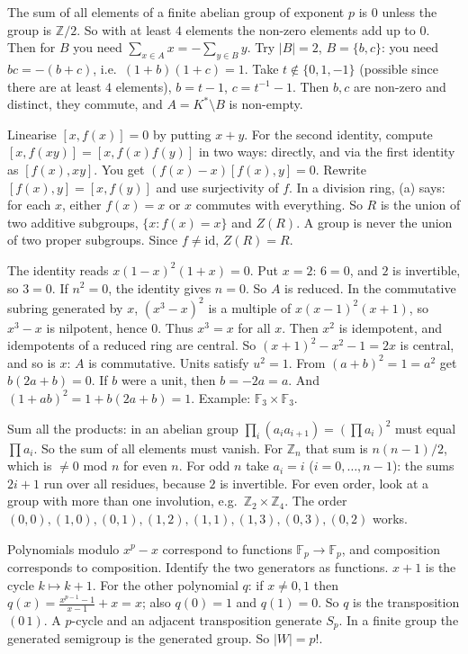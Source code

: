 \documentclass[11pt,a4paper]{article}
\begin{document}
 The sum of all elements of a finite abelian group of exponent $p$ is $0$ unless the group is $\mathbb Z/2$. So with at least $4$ elements the non-zero elements add up to $0$. Then for $B$ you need $\sum_{x\in A}x=-\sum_{y\in B}y$.
 Try $|B|=2$, $B=\{b,c\}$: you need $bc=-(b+c)$, i.e.\ $(1+b)(1+c)=1$.
 Take $t\notin\{0,1,-1\}$ (possible since there are at least $4$ elements), $b=t-1$, $c=t^{-1}-1$. Then $b,c$ are non-zero and distinct, they commute, and $A=K^*\setminus B$ is non-empty.

 Linearise $[x,f(x)]=0$ by putting $x+y$.
 For the second identity, compute $[x,f(xy)]=[x,f(x)f(y)]$ in two ways: directly, and via the first identity as $[f(x),xy]$. You get $(f(x)-x)[f(x),y]=0$. Rewrite $[f(x),y]=[x,f(y)]$ and use surjectivity of $f$.
 In a division ring, (a) says: for each $x$, either $f(x)=x$ or $x$ commutes with everything. So $R$ is the union of two additive subgroups, $\{x:f(x)=x\}$ and $Z(R)$.
 A group is never the union of two proper subgroups. Since $f\ne\mathrm{id}$, $Z(R)=R$.

 The identity reads $x(1-x)^2(1+x)=0$. Put $x=2$: $6=0$, and $2$ is invertible, so $3=0$.
 If $n^2=0$, the identity gives $n=0$. So $A$ is reduced. In the commutative subring generated by $x$, $(x^3-x)^2$ is a multiple of $x(x-1)^2(x+1)$, so $x^3-x$ is nilpotent, hence $0$. Thus $x^3=x$ for all $x$.
 Then $x^2$ is idempotent, and idempotents of a reduced ring are central. So $(x+1)^2-x^2-1=2x$ is central, and so is $x$: $A$ is commutative. Units satisfy $u^2=1$.
 From $(a+b)^2=1=a^2$ get $b(2a+b)=0$. If $b$ were a unit, then $b=-2a=a$. And $(1+ab)^2=1+b(2a+b)=1$. Example: $\mathbb F_3\times\mathbb F_3$.

 Sum all the products: in an abelian group $\prod_i(a_ia_{i+1})=(\prod a_i)^2$ must equal $\prod a_i$. So the sum of all elements must vanish. For $\mathbb Z_n$ that sum is $n(n-1)/2$, which is $\ne0$ mod $n$ for even $n$.
 For odd $n$ take $a_i=i$ ($i=0,\dots,n-1$): the sums $2i+1$ run over all residues, because $2$ is invertible.
 For even order, look at a group with more than one involution, e.g.\ $\mathbb Z_2\times\mathbb Z_4$. The order $(0,0),(1,0),(0,1),(1,2),(1,1),(1,3),(0,3),(0,2)$ works.

 Polynomials modulo $x^p-x$ correspond to functions $\mathbb F_p\to\mathbb F_p$, and composition corresponds to composition. Identify the two generators as functions.
 $x+1$ is the cycle $k\mapsto k+1$. For the other polynomial $q$: if $x\ne0,1$ then $q(x)=\frac{x^{p-1}-1}{x-1}+x=x$; also $q(0)=1$ and $q(1)=0$. So $q$ is the transposition $(0\,1)$.
 A $p$-cycle and an adjacent transposition generate $S_p$. In a finite group the generated semigroup is the generated group. So $|W|=p!$.
\end{document}
